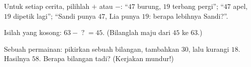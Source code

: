 \begin{exercise}[$\star$]\label{exo:g2:subtraction:8}
Untuk setiap cerita, pilihlah $+$ atau $-$: ``$47$ burung, $19$
terbang pergi''; ``$47$ apel, $19$ dipetik lagi''; ``Sandi punya
$47$, Lia punya $19$: berapa lebihnya Sandi?''.
\end{exercise}

\begin{exercise}[$\star$]\label{exo:g2:subtraction:9}
Isilah yang kosong: $63 - \;?\; = 45$. (Bilanglah maju dari $45$ ke $63$.)
\end{exercise}

\begin{exercise}[$\star\star$]\label{exo:g2:subtraction:10}
Sebuah permainan: pikirkan sebuah bilangan, tambahkan $30$, lalu
kurangi $18$. Hasilnya $58$. Berapa bilangan tadi? (Kerjakan mundur!)

\end{exercise}
